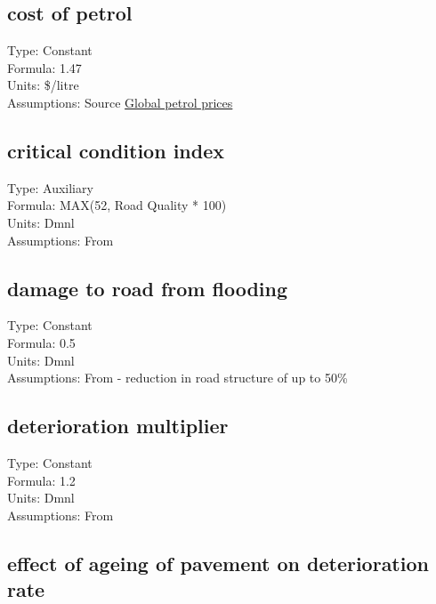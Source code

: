 \documentclass[
  11pt,
]{book}
\begin{document}
\hypertarget{cost-of-petrol}{%
\subsection{cost of petrol}\label{cost-of-petrol}}

Type: Constant\\
Formula: 1.47\\
Units: \$/litre\\
Assumptions: Source \href{https://www.globalpetrolprices.com/Australia/Melbourne/gasoline_prices}{Global petrol prices}

\hypertarget{critical-condition-index}{%
\subsection{critical condition index}\label{critical-condition-index}}

Type: Auxiliary\\
Formula: MAX(52, Road Quality * 100)\\
Units: Dmnl\\
Assumptions: From \citet{fallah-fini_measuring_2015}

\hypertarget{damage-to-road-from-flooding}{%
\subsection{damage to road from flooding}\label{damage-to-road-from-flooding}}

Type: Constant\\
Formula: 0.5\\
Units: Dmnl\\
Assumptions: From \citet{sultana_study_2015} - reduction in road structure of up to 50\%

\hypertarget{deterioration-multiplier}{%
\subsection{deterioration multiplier}\label{deterioration-multiplier}}

Type: Constant\\
Formula: 1.2\\
Units: Dmnl\\
Assumptions: From \citet{fallah-fini_measuring_2015}

\hypertarget{effect-of-ageing-of-pavement-on-deterioration-rate}{%
\subsection{effect of ageing of pavement on deterioration rate}\label{effect-of-ageing-of-pavement-on-deterioration-rate}}
\end{document}

